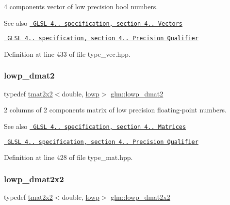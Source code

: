4 components vector of low precision bool numbers.

\begin{DoxySeeAlso}{See also}
\href{http://www.opengl.org/registry/doc/GLSLangSpec.4.20.8.pdf}{\texttt{ G\+L\+SL 4.. specification, section 4.. Vectors}} 

\href{http://www.opengl.org/registry/doc/GLSLangSpec.4.20.8.pdf}{\texttt{ G\+L\+SL 4.. specification, section 4.. Precision Qualifier}} 
\end{DoxySeeAlso}


Definition at line 433 of file type\+\_\+vec.\+hpp.

\mbox{\label{group__core__precision_ga42a83e53bbcc740b6ae501fec19dda69}} 
\subsubsection{\texorpdfstring{lowp\_dmat2}{lowp\_dmat2}}
{\footnotesize\ttfamily typedef \mbox{\hyperlink{structglm_1_1tmat2x2}{tmat2x2}}$<$double, \mbox{\hyperlink{namespaceglm_a0f04f086094c747d227af4425893f545ae161af3fc695e696ce3bf69f7332bc2d}{lowp}}$>$ \mbox{\hyperlink{group__core__precision_ga42a83e53bbcc740b6ae501fec19dda69}{glm\+::lowp\+\_\+dmat2}}}

2 columns of 2 components matrix of low precision floating-\/point numbers.

\begin{DoxySeeAlso}{See also}
\href{http://www.opengl.org/registry/doc/GLSLangSpec.4.20.8.pdf}{\texttt{ G\+L\+SL 4.. specification, section 4.. Matrices}} 

\href{http://www.opengl.org/registry/doc/GLSLangSpec.4.20.8.pdf}{\texttt{ G\+L\+SL 4.. specification, section 4.. Precision Qualifier}} 
\end{DoxySeeAlso}


Definition at line 428 of file type\+\_\+mat.\+hpp.

\mbox{\label{group__core__precision_ga62d3af99b9e0659d693c80b75df9a35c}} 
\subsubsection{\texorpdfstring{lowp\_dmat2x2}{lowp\_dmat2x2}}
{\footnotesize\ttfamily typedef \mbox{\hyperlink{structglm_1_1tmat2x2}{tmat2x2}}$<$double, \mbox{\hyperlink{namespaceglm_a0f04f086094c747d227af4425893f545ae161af3fc695e696ce3bf69f7332bc2d}{lowp}}$>$ \mbox{\hyperlink{group__core__precision_ga62d3af99b9e0659d693c80b75df9a35c}{glm\+::lowp\+\_\+dmat2x2}}}

